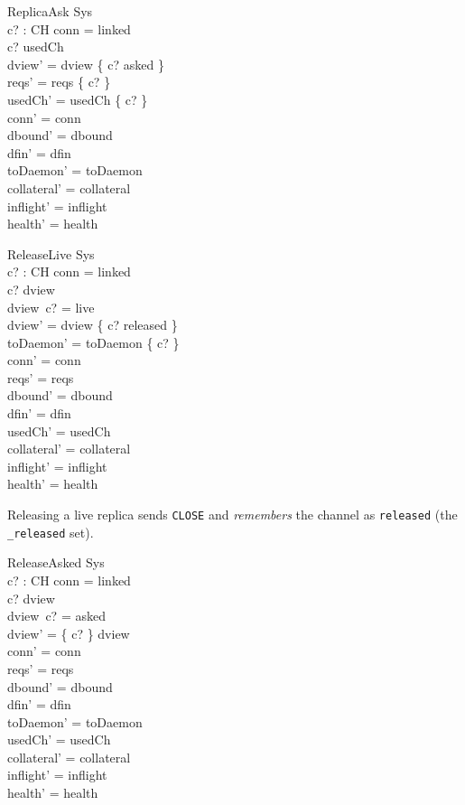 \documentclass[a4paper,10pt,fleqn]{article}
\begin{document}
\begin{schema}{ReplicaAsk}
  \Delta Sys \\
  c? : CH
\where
  conn = linked \\
  c? \notin usedCh \\
  dview' = dview \cup \{ c? \mapsto asked \} \\
  reqs' = reqs \cup \{ c? \} \\
  usedCh' = usedCh \cup \{ c? \} \\
  conn' = conn \\
  dbound' = dbound \\
  dfin' = dfin \\
  toDaemon' = toDaemon \\
  collateral' = collateral \\
  inflight' = inflight \\
  health' = health
\end{schema}

\begin{schema}{ReleaseLive}
  \Delta Sys \\
  c? : CH
\where
  conn = linked \\
  c? \in \dom dview \\
  dview~c? = live \\
  dview' = dview \oplus \{ c? \mapsto released \} \\
  toDaemon' = toDaemon \cup \{ c? \} \\
  conn' = conn \\
  reqs' = reqs \\
  dbound' = dbound \\
  dfin' = dfin \\
  usedCh' = usedCh \\
  collateral' = collateral \\
  inflight' = inflight \\
  health' = health
\end{schema}

Releasing a live replica sends \texttt{CLOSE} and \emph{remembers} the
channel as \texttt{released} (the \texttt{\_released} set).

\begin{schema}{ReleaseAsked}
  \Delta Sys \\
  c? : CH
\where
  conn = linked \\
  c? \in \dom dview \\
  dview~c? = asked \\
  dview' = \{ c? \} \ndres dview \\
  conn' = conn \\
  reqs' = reqs \\
  dbound' = dbound \\
  dfin' = dfin \\
  toDaemon' = toDaemon \\
  usedCh' = usedCh \\
  collateral' = collateral \\
  inflight' = inflight \\
  health' = health
\end{schema}
\end{document}
